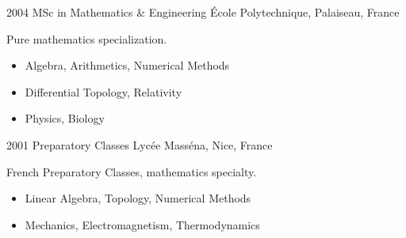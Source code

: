 \documentclass[12pt]{friggeri-cv}
\begin{document}
\begin{entrylist}
  \entry
    {2004}
    {MSc in Mathematics \& Engineering}
    {\'{E}cole Polytechnique, Palaiseau, France}
    {Pure mathematics specialization.
    \begin{itemize}
        \item Algebra, Arithmetics, Numerical Methods
        \item Differential Topology, Relativity
        \item Physics, Biology
    \end{itemize}
    }

  \entry
    {2001}
    {Preparatory Classes}
    {Lyc\'{e}e Mass\'{e}na, Nice, France}
    {French Preparatory Classes, mathematics specialty.
    \begin{itemize}
        \item Linear Algebra, Topology, Numerical Methods
        \item Mechanics, Electromagnetism, Thermodynamics
    \end{itemize}
    }


\end{entrylist}

\newpage
\end{document}
